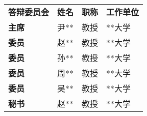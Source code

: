 \begin{committee}

\begin{table}[htbp]
  \centering
  \begin{tabularx}{\textwidth}{
    >{\centering\arraybackslash\hsize=1.1\hsize}X %
    >{\centering\arraybackslash\hsize=0.7\hsize}X %
    >{\centering\arraybackslash\hsize=0.7\hsize}X %
    >{\centering\arraybackslash\hsize=1.5\hsize}X %
  }
  \textbf{答辩委员会} & \textbf{姓名} & \textbf{职称} & \textbf{工作单位} \\
  \textbf{主席} & 尹** & 教授 & **大学 \\
  \textbf{委员} & 赵** & 教授 & **大学 \\
  \textbf{委员} & 孙** & 教授 & **大学 \\
  \textbf{委员} & 周** & 教授 & **大学 \\
  \textbf{委员} & 吴** & 教授 & **大学 \\
  \textbf{秘书} & 赵** & 教授 & **大学 \\
  \end{tabularx}
\end{table}



\end{committee}